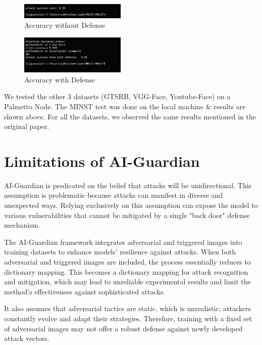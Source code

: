 \documentclass[letterpaper,twocolumn,10pt]{article}
\begin{document}
    \begin{figure}[htbp]
      \centering
      \includegraphics[width=0.45\textwidth]{3.png}
      \caption{Accuracy without Defense}
      \label{fig:my_label}
    \end{figure}

    \begin{figure}[htbp]
      \centering
      \includegraphics[width=0.45\textwidth]{4.png}
      \caption{Accuracy with Defense}
      \label{fig:my_label}
    \end{figure}

We tested the other 3 datasets (GTSRB, VGG-Face, Youtube-Face) on a Palmetto Node. The MINST test was done on the local machine \& results are shown above. For all the datasets, we observed the same results mentioned in the original paper.

\section{Limitations of AI-Guardian}

AI-Guardian is predicated on the belief that attacks will be unidirectional. This assumption is problematic because attacks can manifest in diverse and unexpected ways. Relying exclusively on this assumption can expose the model to various vulnerabilities that cannot be mitigated by a single "back door" defense mechanism.

The AI-Guardian framework integrates adversarial and triggered images into training datasets to enhance models' resilience against attacks. 
When both adversarial and triggered images are included, the process essentially reduces to dictionary mapping. This becomes a dictionary mapping for attack recognition and mitigation, which may lead to unreliable experimental results and limit the method's effectiveness against sophisticated attacks.

It also assumes that adversarial tactics are static, which is unrealistic; attackers constantly evolve and adapt their strategies. Therefore, training with a fixed set of adversarial images may not offer a robust defense against newly developed attack vectors.
\end{document}
